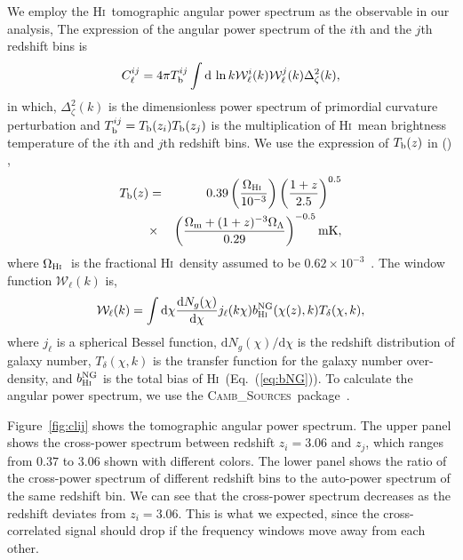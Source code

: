 \documentclass[twocolumn,floatfix,nofootinbib,aps,reprint]{revtex4}
\def\hi{\textsc{Hi~}}
\def\cambs{\textsc{Camb\_Sources~}}
\begin{document}
We employ the \hi tomographic angular power spectrum as the 
observable in our analysis,
The expression of the angular power spectrum of the 
$i$th and the $j$th redshift bins is
\begin{equation}
    C_\ell^{ij} = 4\pi T_{\rm b}^{ij} \int \mathrm{d}\,\ln k \mathcal{W}_\ell^i(k) 
    \mathcal{W}_\ell^j(k) \Delta_\zeta^2(k),
\end{equation}
in which, $\Delta_\zeta^2(k)$ is the dimensionless power spectrum of primordial
curvature perturbation and $T_{\rm b}^{ij} = T_{\rm b}(z_i)T_{\rm b}(z_j)$ is the multiplication 
of \hi mean brightness temperature of the $i$th and $j$th redshift bins.
We use the expression of $T_{\rm b}(z)$ in 
\citeauthor{2008PhRvL.100i1303C}(\citeyear{2008PhRvL.100i1303C})
\citep{2008PhRvL.100i1303C}, 
\begin{eqnarray}
        T_{\rm b}(z) &=& 0.39 
        \left(\frac{\Omega_\hi}{10^{-3}}\right)
        \left(\frac{1+z}{2.5}\right)^{0.5}  \nonumber \\
       & \times & 
        \left(\frac{\Omega_{\rm m} + (1+z)^{-3}\Omega_\Lambda}{0.29}\right)^{-0.5}
        \mathrm{mK},
\end{eqnarray}
where $\Omega_\mathrm{\hi}$ is the fractional \hi density assumed to be 
$0.62\times10^{-3}$~\cite{2013MNRAS.434L..46S}.
The window function $\mathcal{W}_\ell(k)$ is,
\begin{equation}
    \mathcal{W}_\ell(k) = \int \mathrm{d}\chi 
    \frac{\mathrm{d}N_g(\chi)}{\mathrm{d}\chi} j_\ell(k\chi)
    b_\mathrm{\hi}^\mathrm{NG}(\chi(z), k)T_\delta(\chi,k),
\end{equation}
where $j_\ell$ is a spherical Bessel function, 
$\mathrm{d}N_g(\chi)/\mathrm{d}\chi$ is the redshift 
distribution of galaxy number, $T_\delta(\chi, k)$ is the transfer 
function for the galaxy number over-density, and $b_\mathrm{\hi}^\mathrm{NG}$
is the total bias of \hi (Eq.~(\ref{eq:bNG})). To calculate the angular power
spectrum, we use the \cambs package~\cite{2011PhRvD..84d3516C}.

Figure~\ref{fig:clij} shows the tomographic angular power spectrum.
The upper panel shows the cross-power spectrum between redshift
$z_i=3.06$ and $z_j$, which ranges from $0.37$ to $3.06$ shown with
different colors. The lower panel shows the ratio of
the cross-power spectrum of different redshift bins to the 
auto-power spectrum of the same redshift bin.
We can see that the cross-power spectrum decreases as the 
redshift deviates from $z_{i}=3.06$. This is what we expected, since the cross-correlated
signal should drop if the frequency windows move away from each other.
\end{document}

